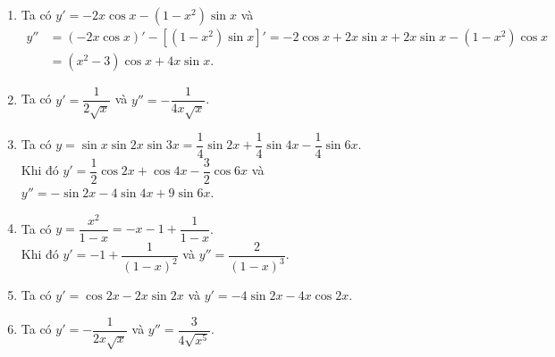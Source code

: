 \begin{ex}
{\begin{enumerate}
\begin{align*}
		y''&=\left(\dfrac{2x^2+1}{\sqrt{1+x^2}}\right)'=\dfrac{4x\cdot\sqrt{1+x^2}-\left(2x^2+1\right)\cdot\dfrac{x}{\sqrt{1+x^2}}}{1+x^2}\\ 
		&=\dfrac{4x\left(1+x^2\right)-\left(2x^2+1\right)x}{\left(1+x^2\right)\sqrt{1+x^2}}=\dfrac{2x^3+3x}{\left(1+x^2\right)\sqrt{1+x^2}}. 
	\end{align*}
	 \item Ta có $y'=-2x\cos x-\left(1-x^2\right)\sin x$ và
	\begin{align*}
		y''&=\left(-2x\cos x\right)'-\left[\left(1-x^2\right)\sin  x\right]'=-2\cos x+2x\sin x+2x\sin x-\left(1-x^2\right)\cos x\\
		&=\left(x^2-3\right)\cos x+4x\sin x. 
	\end{align*}
	\item Ta có $y'=\dfrac{1}{2\sqrt{x}}$  và $y''=-\dfrac{1}{4x\sqrt{x}}$.
	\item Ta có $y=\sin x\sin 2x\sin 3x=\dfrac{1}{4}\sin 2x+\dfrac{1}{4}\sin 4x-\dfrac{1}{4}\sin  6x$.\\
	Khi đó $y'=\dfrac{1}{2}\cos 2x+\cos 4x-\dfrac{3}{2}\cos  6x$ và $y''=-\sin 2x-4\sin 4x+9\sin 6x$.
	\item Ta có  $y=\dfrac{x^2}{1-x}=-x-1+\dfrac{1}{1-x}$.\\
	 Khi đó $y'=-1+\dfrac{1}{(1-x)^2}$ và $y''=\dfrac{2}{(1-x)^3}$.
	\item Ta có  $y'=\cos 2x-2x\sin 2x$ và $y'=-4\sin 2x-4x\cos 2x$.
	\item  Ta có $y'=-\dfrac{1}{2x\sqrt{x}}$ và $y''=\dfrac{3}{4\sqrt{x^5}}$.
	\end{enumerate}
 }
\end{ex}

